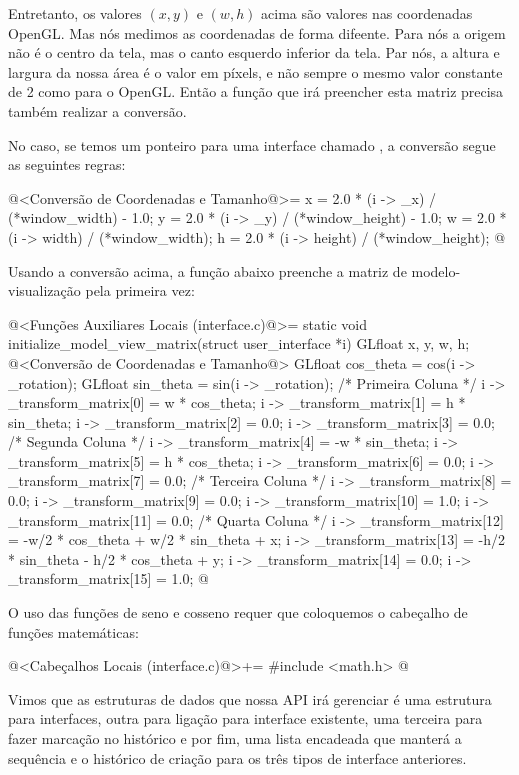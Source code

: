 Entretanto, os valores $(x, y)$ e $(w, h)$ acima são valores nas
coordenadas OpenGL. Mas nós medimos as coordenadas de forma
difeente. Para nós a origem não é o centro da tela, mas o canto
esquerdo inferior da tela. Par nós, a altura e largura da nossa área é
o valor em píxels, e não sempre o mesmo valor constante de 2 como para
o OpenGL. Então a função que irá preencher esta matriz precisa também
realizar a conversão.

No caso, se temos um ponteiro para uma interface
chamado , a conversão segue as seguintes regras:

\iniciocodigo
@<Conversão de Coordenadas e Tamanho@>=
x = 2.0 * (i -> _x) / (*window_width) - 1.0;
y = 2.0 * (i -> _y) / (*window_height) - 1.0;
w = 2.0 * (i -> width) / (*window_width);
h = 2.0 * (i -> height) / (*window_height);
@
\fimcodigo

Usando a conversão acima, a função abaixo preenche a matriz de
modelo-visualização pela primeira vez:

\iniciocodigo
@<Funções Auxiliares Locais (interface.c)@>=
static void initialize_model_view_matrix(struct user_interface *i){
  GLfloat x, y, w, h;
  @<Conversão de Coordenadas e Tamanho@>
  GLfloat cos_theta = cos(i -> _rotation);
  GLfloat sin_theta = sin(i -> _rotation);
  /* Primeira Coluna */
  i -> _transform_matrix[0] = w * cos_theta;
  i -> _transform_matrix[1] = h * sin_theta;
  i -> _transform_matrix[2] = 0.0;
  i -> _transform_matrix[3] = 0.0;
  /* Segunda Coluna */
  i -> _transform_matrix[4] = -w * sin_theta;
  i -> _transform_matrix[5] = h * cos_theta;
  i -> _transform_matrix[6] = 0.0;
  i -> _transform_matrix[7] = 0.0;
  /* Terceira Coluna */
  i -> _transform_matrix[8] = 0.0;
  i -> _transform_matrix[9] = 0.0;
  i -> _transform_matrix[10] = 1.0;
  i -> _transform_matrix[11] = 0.0;
  /* Quarta Coluna */
  i -> _transform_matrix[12] = -w/2 * cos_theta + w/2 * sin_theta + x;
  i -> _transform_matrix[13] = -h/2 * sin_theta - h/2 * cos_theta + y;
  i -> _transform_matrix[14] = 0.0;
  i -> _transform_matrix[15] = 1.0;
}
@
\fimcodigo

O uso das funções de seno e cosseno requer que coloquemos o cabeçalho
de funções matemáticas:

\iniciocodigo
@<Cabeçalhos Locais (interface.c)@>+=
#include <math.h>
@
\fimcodigo


Vimos que as estruturas de dados que nossa API irá gerenciar é uma
estrutura para interfaces, outra para ligação para interface
existente, uma terceira para fazer marcação no histórico e por fim,
uma lista encadeada que manterá a sequência e o histórico de criação
para os três tipos de interface anteriores.

